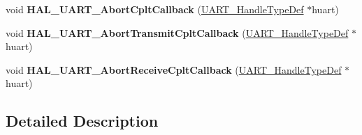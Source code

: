 \begin{DoxyCompactItemize}
\item 
\mbox{\label{group___u_a_r_t___exported___functions___group2_gacdcb274a742093c45869f2cfbb0a8b09}} 
void {\bfseries H\+A\+L\+\_\+\+U\+A\+R\+T\+\_\+\+Abort\+Cplt\+Callback} (\hyperlink{struct_u_a_r_t___handle_type_def}{U\+A\+R\+T\+\_\+\+Handle\+Type\+Def} $\ast$huart)
\item 
\mbox{\label{group___u_a_r_t___exported___functions___group2_gacf94995fb9986930151f3c5586d37e5c}} 
void {\bfseries H\+A\+L\+\_\+\+U\+A\+R\+T\+\_\+\+Abort\+Transmit\+Cplt\+Callback} (\hyperlink{struct_u_a_r_t___handle_type_def}{U\+A\+R\+T\+\_\+\+Handle\+Type\+Def} $\ast$huart)
\item 
\mbox{\label{group___u_a_r_t___exported___functions___group2_ga0f9d15c5ae7b69f09e0ee5f2461e7e7a}} 
void {\bfseries H\+A\+L\+\_\+\+U\+A\+R\+T\+\_\+\+Abort\+Receive\+Cplt\+Callback} (\hyperlink{struct_u_a_r_t___handle_type_def}{U\+A\+R\+T\+\_\+\+Handle\+Type\+Def} $\ast$huart)
\end{DoxyCompactItemize}


\subsection{Detailed Description}
